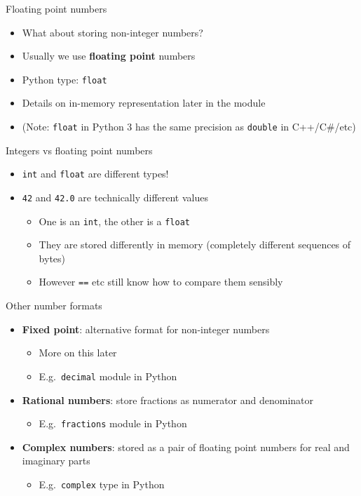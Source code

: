 \begin{frame}{Floating point numbers}
	\begin{itemize}
		\pause\item What about storing non-integer numbers?
		\pause\item Usually we use \textbf{floating point} numbers
		\pause\item Python type: \lstinline{float}
		\pause\item Details on in-memory representation later in the module
		\pause\item (Note: \lstinline{float} in Python 3 has the same precision as \lstinline{double} in C++/C\#/etc)
	\end{itemize}
\end{frame}

\begin{frame}{Integers vs floating point numbers}
	\begin{itemize}
		\pause\item \lstinline{int} and \lstinline{float} are different types!
		\pause\item \lstinline{42} and \lstinline{42.0} are technically different values
			\begin{itemize}
				\pause\item One is an \lstinline{int}, the other is a \lstinline{float}
				\pause\item They are stored differently in memory (completely different sequences of bytes)
				\pause\item However \lstinline{==} etc still know how to compare them sensibly
			\end{itemize}
	\end{itemize}
\end{frame}

\begin{frame}{Other number formats}
	\begin{itemize}
		\pause\item \textbf{Fixed point}: alternative format for non-integer numbers
            \begin{itemize}
                \pause\item More on this later
                \pause\item E.g.\ \lstinline{decimal} module in Python
            \end{itemize}
        \pause\item \textbf{Rational numbers}: store fractions as numerator and denominator
            \begin{itemize}
                \pause\item E.g.\ \lstinline{fractions} module in Python
            \end{itemize}
        \pause\item \textbf{Complex numbers}: stored as a pair of floating point numbers for real and imaginary parts
            \begin{itemize}
                \pause\item E.g.\ \lstinline{complex} type in Python
            \end{itemize}
	\end{itemize}
\end{frame}

